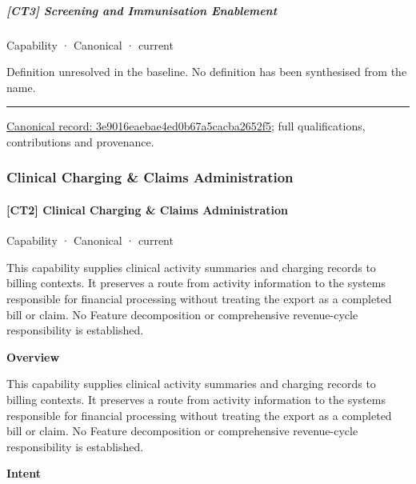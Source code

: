 \subparagraph{[CT3] Screening and Immunisation Enablement}

\label{element:3e9016eaebae4ed0b67a5cacba2652f5}
{\small Capability · Canonical · current}\par

Definition unresolved in the baseline. No definition has been synthesised from the name.



\medskip\hrule\medskip

{\footnotesize \href{../../../../continuum/strategy/capability/3e9016eaebae4ed0b67a5cacba2652f5.md}{Canonical record: 3e9016eaebae4ed0b67a5cacba2652f5}; full qualifications, contributions and provenance.}\par
\subsubsection{Clinical Charging \& Claims Administration}

\paragraph{[CT2] Clinical Charging \& Claims Administration}

\label{element:af78ab7c89454a608cd4d34ec7703331}
{\small Capability · Canonical · current}\par

This capability supplies clinical activity summaries and charging records to billing contexts. It preserves a route from activity information to the systems responsible for financial processing without treating the export as a completed bill or claim. No Feature decomposition or comprehensive revenue-cycle responsibility is established.



\textbf{Overview}



This capability supplies clinical activity summaries and charging records to billing contexts. It preserves a route from activity information to the systems responsible for financial processing without treating the export as a completed bill or claim. No Feature decomposition or comprehensive revenue-cycle responsibility is established.



\textbf{Intent}



